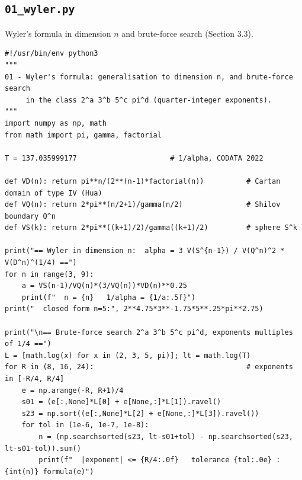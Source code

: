 \documentclass[11pt,a4paper]{article}
\begin{document}
\subsection{\texttt{01\_wyler.py}}
Wyler's formula in dimension $n$ and brute-force search (Section 3.3).
\begin{lstlisting}
#!/usr/bin/env python3
"""
01 - Wyler's formula: generalisation to dimension n, and brute-force search
     in the class 2^a 3^b 5^c pi^d (quarter-integer exponents).
"""
import numpy as np, math
from math import pi, gamma, factorial

T = 137.035999177                      # 1/alpha, CODATA 2022

def VD(n): return pi**n/(2**(n-1)*factorial(n))          # Cartan domain of type IV (Hua)
def VQ(n): return 2*pi**(n/2+1)/gamma(n/2)               # Shilov boundary Q^n
def VS(k): return 2*pi**((k+1)/2)/gamma((k+1)/2)         # sphere S^k

print("== Wyler in dimension n:  alpha = 3 V(S^{n-1}) / V(Q^n)^2 * V(D^n)^(1/4) ==")
for n in range(3, 9):
    a = VS(n-1)/VQ(n)*(3/VQ(n))*VD(n)**0.25
    print(f"  n = {n}   1/alpha = {1/a:.5f}")
print("  closed form n=5:", 2**4.75*3**-1.75*5**.25*pi**2.75)

print("\n== Brute-force search 2^a 3^b 5^c pi^d, exponents multiples of 1/4 ==")
L = [math.log(x) for x in (2, 3, 5, pi)]; lt = math.log(T)
for R in (8, 16, 24):                                    # exponents in [-R/4, R/4]
    e = np.arange(-R, R+1)/4
    s01 = (e[:,None]*L[0] + e[None,:]*L[1]).ravel()
    s23 = np.sort((e[:,None]*L[2] + e[None,:]*L[3]).ravel())
    for tol in (1e-6, 1e-7, 1e-8):
        n = (np.searchsorted(s23, lt-s01+tol) - np.searchsorted(s23, lt-s01-tol)).sum()
        print(f"  |exponent| <= {R/4:.0f}   tolerance {tol:.0e} : {int(n)} formula(e)")
\end{lstlisting}
\end{document}
